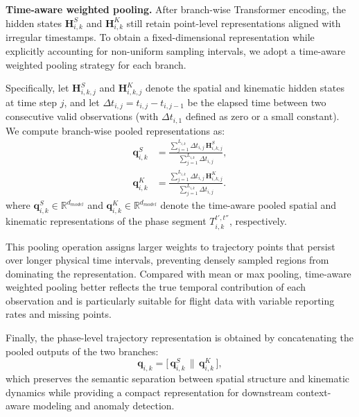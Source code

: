 \documentclass[iicol,pdflatex,sn-basic,Numbered]{sn-jnl}%
\theoremstyle{thmstyleone}%
\theoremstyle{thmstyletwo}%
\theoremstyle{thmstylethree}%
\begin{document}
\textbf{Time-aware weighted pooling.} After branch-wise Transformer encoding, the hidden states $\mathbf{H}_{i,k}^S$ and $\mathbf{H}_{i,k}^K$ still retain point-level representations aligned with irregular timestamps.
To obtain a fixed-dimensional representation while explicitly accounting for non-uniform sampling intervals, we adopt a time-aware weighted pooling strategy for each branch.

Specifically, let $\mathbf{H}_{i,k,j}^S$ and $\mathbf{H}_{i,k,j}^K$ denote the spatial and kinematic hidden states at time step $j$, and let $\Delta t_{i,j} = t_{i,j} - t_{i,j-1}$ be the elapsed time between two consecutive valid observations (with $\Delta t_{i,1}$ defined as zero or a small constant).
We compute branch-wise pooled representations as:
\begin{equation}
\label{eq:segment_pool}
\begin{aligned}
\mathbf{q}_{i,k}^S &=
\frac{\sum\limits_{j=1}^{L_{i,k}} \Delta t_{i,j}\,\mathbf{H}_{i,k,j}^S}
{\sum\limits_{j=1}^{L_{i,k}} \Delta t_{i,j}},\\
\mathbf{q}_{i,k}^K &=
\frac{\sum\limits_{j=1}^{L_{i,k}} \Delta t_{i,j}\,\mathbf{H}_{i,k,j}^K}
{\sum\limits_{j=1}^{L_{i,k}} \Delta t_{i,j}}.
\end{aligned}
\end{equation}
where $\mathbf{q}_{i,k}^S \in \mathbb{R}^{d_{model}}$ and $\mathbf{q}_{i,k}^K \in \mathbb{R}^{d_{model}}$ denote the time-aware pooled spatial and kinematic representations of the phase segment $T^{t',t''}_{i,k}$, respectively.

This pooling operation assigns larger weights to trajectory points that persist over longer physical time intervals, preventing densely sampled regions from dominating the representation.
Compared with mean or max pooling, time-aware weighted pooling better reflects the true temporal contribution of each observation and is particularly suitable for flight data with variable reporting rates and missing points.

Finally, the phase-level trajectory representation is obtained by concatenating the pooled outputs of the two branches:
\begin{equation}
\mathbf{q}_{i,k} = \big[\,\mathbf{q}_{i,k}^S \,\|\, \mathbf{q}_{i,k}^K\,\big],
\end{equation}
which preserves the semantic separation between spatial structure and kinematic dynamics while providing a compact representation for downstream context-aware modeling and anomaly detection.
\end{document}
